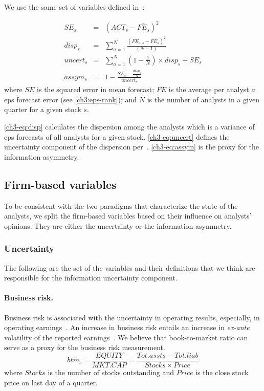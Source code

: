 \documentclass[a4paper,twoside,12pt,openright,notitlepage]{report}\usepackage[]{graphicx}\usepackage[]{color}
\begin{document}
We use the same set of variables defined in~\cite[page 333]{barron2009}:

\begin{eqnarray}
SE_{s}&=&(ACT_{s}-\overline{FE_s})^2 \nonumber\\
disp_s&=&\sum_{a=1}^{N} \frac{(FE_{a,s}-\overline{FE_s})^2}{(N-1)} \label{ch3-eq:disp}\\
uncert_s&=&\sum_{a=1}^{N} \left(1-\frac{1}{N}\right) \times disp_s + SE_s \label{ch3-eq:uncert}\\
assym_s& = & 1-\frac{SE_s-\frac{disp_s}{N}}{uncert_s} \label{ch3-eq:assym}
\end{eqnarray}
where $SE$ is the squared error in mean forecast; $\overline{FE}$ is the average per analyst $a$ \gls{eps} forecast error (see \ref{ch3:eps-rank});  and $N$ is the number of analysts in a given quarter for a given stock $s$.

\ref{ch3-eq:disp} calculates the dispersion among the analysts which is a variance of \gls{eps} forecasts of all analysts for a given stock. \ref{ch3-eq:uncert} defines the uncertainty component of the dispersion per~\cite{barron2009}. \ref{ch3-eq:assym} is the proxy for the information asymmetry.


\subsection{Firm-based variables}

To be consistent with the two paradigms that characterize the state of the analysts, we split the firm-based variables based on their influence on analysts' opinions. They are either the uncertainty or the information asymmetry.

\subsubsection{Uncertainty}

The following are the set of the variables and their definitions that we think are responsible for the information uncertainty component.

\paragraph{Business risk.} Business risk is associated with the uncertainty in operating results, especially, in operating earnings~\citep{hill1980}. An increase in business risk entails an increase in \emph{ex-ante} volatility of the reported earnings~\citep{parkash1995}.  We believe that  book-to-market ratio can serve as a proxy for the business risk measurement.
\begin{equation}
btm_s=\frac{EQUITY}{MKT.CAP}=\frac{Tot.assts-Tot.liab}{Stocks\times Price}
\end{equation}
where $Stocks$ is the number of stocks outstanding and $Price$ is the close stock price on last day of a quarter.
\end{document}
